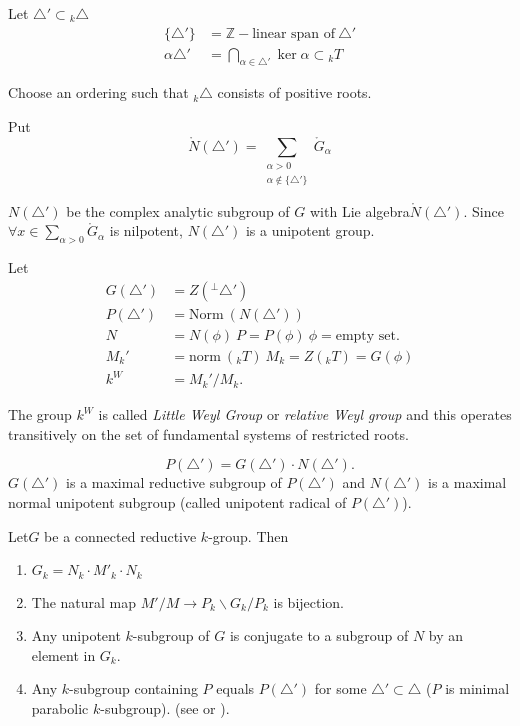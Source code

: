 \begin{notns}
  Let $\triangle' \subset {}_k \triangle$
\begin{align*}
  \{ \triangle'\} & = \mathbb{Z}-\text{linear span of}~ \triangle'\\
  \alpha \triangle' & = \bigcap_{\alpha \in \triangle'} \ker
  \alpha \subset {}_k T
\end{align*}
\end{notns}\pageoriginale

Choose an ordering such that ${}_k \triangle$ consists of positive roots.

Put
$$
\ring{N} (\triangle')= \sum_{\substack{\alpha > 0\\\alpha \notin \{
    \triangle'\}}} \ring{G}_\alpha 
$$

$N (\triangle')$ be the complex analytic subgroup of $G$ with Lie
algebra\break $\ring{N} (\triangle')$. Since $\forall x \in
\displaystyle{\sum_{\alpha > 0}} \ring{G}_\alpha$ is nilpotent, $N
(\triangle')$ is a unipotent group.

Let 
\begin{align*}
  G (\triangle') & = Z({}^\perp \triangle')\\
  P (\triangle') & = \text{Norm}~ (N (\triangle'))\\
  N & = N (\phi)~ P  = P (\phi) ~\phi = \text{empty set}.\\
  M_k' & = \text{norm}~({}_k T)~ M_k  = Z({}_k T) = G (\phi)\\
  k^W & = M_k'/ M_k.
\end{align*}

The group $k^W$ is called \textit{Little Weyl Group} or
\textit{relative Weyl group} and this operates transitively on the set
of fundamental systems of restricted roots.

\begin{lemma}\label{chap0:lem0.12} %
  $$
  P (\triangle') = G(\triangle') \cdot N (\triangle').
  $$
  $G(\triangle')$ is a maximal reductive subgroup of $P (\triangle')$
  and $N (\triangle')$ is a maximal normal unipotent subgroup (called
  unipotent radical of $P(\triangle')$).
\end{lemma}

\begin{thm}\label{chap0:thm0.13} %
  Let\pageoriginale $G$ be a connected reductive $k$-group. Then
  \begin{enumerate}[\rm 1.]
    \item $G_k = N_k \cdot M'_k \cdot N_k$
      \item The natural map $M'/M \to P_k \backslash G_k /P_k$ is
        bijection.
        \item Any unipotent $k$-subgroup of $G$ is conjugate to a
          subgroup of $N$ by an element in $G_k$.
          \item Any $k$-subgroup containing $P$ equals $P
            (\triangle')$ for some $\triangle' \subset \triangle$ ($P$
            is minimal parabolic $k$-subgroup). (see \cite{4} or
            \cite{21}). 
  \end{enumerate}
\end{thm}

